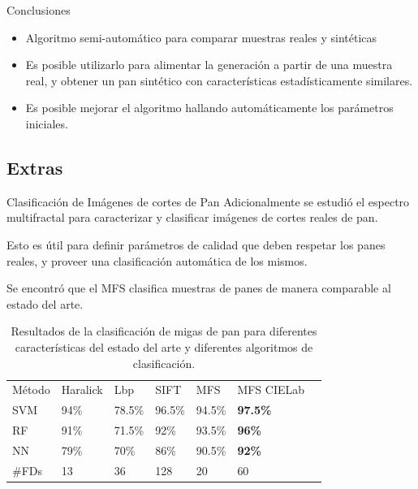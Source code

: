 \documentclass[spanish]{beamer}
\begin{document}
\begin{frame}{Conclusiones}
\begin{block}{}
\begin{itemize}
\item Algoritmo semi-automático para comparar muestras reales y sintéticas
\item Es posible utilizarlo para alimentar la generación a partir de una muestra real, y obtener un pan sintético con características estadísticamente similares.
\item Es posible mejorar el algoritmo hallando automáticamente los parámetros iniciales.
\end{itemize}
\end{block}

\end{frame}

\subsection{Extras}

\begin{frame}{Clasificación de Imágenes de cortes de Pan}
Adicionalmente se estudió el espectro multifractal para caracterizar y clasificar imágenes de cortes reales de pan.

Esto es útil para definir parámetros de calidad que deben respetar los panes reales, y proveer una clasificación automática de los mismos.

Se encontró que el MFS clasifica muestras de panes de manera comparable al estado del arte.

\end{frame}

\begin{frame}
\begin{table}[h!]
\center
\begin{tabular}{lllllll}
\hline\noalign{\smallskip}
Método & Haralick & Lbp & SIFT & MFS & MFS CIELab\\ %
\noalign{\smallskip}\hline\noalign{\smallskip}
SVM & 94\% & 78.5\% & 96.5\% & 94.5\% & \textbf{97.5\%} \\
RF  & 91\% & 71.5\% & 92\% & 93.5\% & \textbf{96\%} \\
NN & 79\% & 70\% & 86\%  & 90.5\% & \textbf{92\%} \\
\noalign{\smallskip}\hline
\#FDs & 13 & 36 & 128 & 20 & 60\\
\hline
\end{tabular}
\caption{Resultados de la clasificación de migas de pan para diferentes características del estado del arte y diferentes algoritmos de clasificación.}
\label{tab:other} 
\end{table}
\end{frame}
\end{document}
